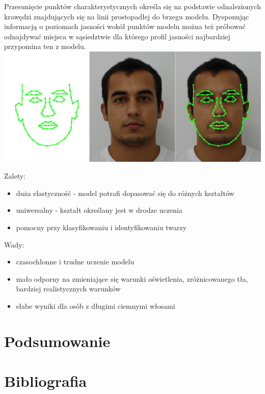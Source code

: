 \documentclass[11pt,a4paper]{article}
\begin{document}
Przesunięcie punktów charakterystycznych określa się na podstawie odnalezionych krawędzi znajdujących się na linii prostopadłej do brzegu modelu. Dysponując informacją o poziomach jasności wokół punktów modelu można też próbować odnajdywać miejsca w sąsiedztwie dla którego profil jasności najbardziej przypomina ten z modelu. \\

\vspace*{1cm}
\includegraphics[scale=0.40]{active_shape.png}
\vspace*{1cm}

\noindent 
Zalety:
\begin{itemize}
\item duża elastyczność - model potrafi dopasować się do różnych kształtów
\item uniwersalny - kształt określany jest w drodze uczenia
\item pomocny przy klasyfikowaniu i identyfikowaniu twarzy
\end{itemize}

\noindent 
Wady:
\begin{itemize}
\item  czasochłonne i trudne uczenie modelu 
\item  mało odporny na zmieniające się warunki oświetlenia, zróżnicowanego tła, bardziej realistycznych warunków
\item  słabe wyniki dla osób z długimi ciemnymi włosami
\end{itemize}

\section{Podsumowanie}

\section{Bibliografia}


\end{document}
